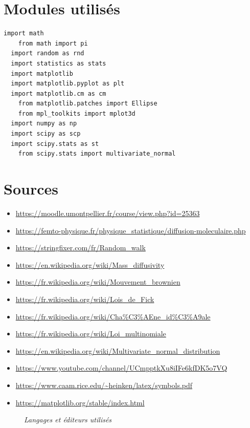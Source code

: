 \documentclass{report}
\begin{document}
\appendix
\chapter{Modules utilisés}

\begin{lstlisting}[caption={\it Modules utilisés en Python 3.9.2}, label=annexe]
  import math
    from math import pi
  import random as rnd
  import statistics as stats
  import matplotlib
  import matplotlib.pyplot as plt
  import matplotlib.cm as cm
    from matplotlib.patches import Ellipse
    from mpl_toolkits import mplot3d
  import numpy as np
  import scipy as scp
  import scipy.stats as st
    from scipy.stats import multivariate_normal

\end{lstlisting}

\chapter{Sources}

\begin{itemize}
  \item \url{https://moodle.umontpellier.fr/course/view.php?id=25363}
  \item \url{https://femto-physique.fr/physique_statistique/diffusion-moleculaire.php}
  \item \url{https://stringfixer.com/fr/Random_walk}
  \item \url{https://en.wikipedia.org/wiki/Mass_diffusivity}
  \item \url{https://fr.wikipedia.org/wiki/Mouvement_brownien}
  \item \url{https://fr.wikipedia.org/wiki/Lois_de_Fick}
  \item \url{https://fr.wikipedia.org/wiki/Cha%C3%AEne_id%C3%A9ale}
  \item \url{https://fr.wikipedia.org/wiki/Loi_multinomiale}
  \item \url{https://en.wikipedia.org/wiki/Multivariate_normal_distribution}
  \item \url{https://www.youtube.com/channel/UCmpptkXu8iIFe6kfDK5o7VQ}
  \item \url{https://www.caam.rice.edu/~heinken/latex/symbols.pdf}
  \item \url{https://matplotlib.org/stable/index.html}
\end{itemize}

\begin{figure}
  \centering

  \caption{\it Langages et éditeurs utilisés}
\end{figure}
\end{document}
